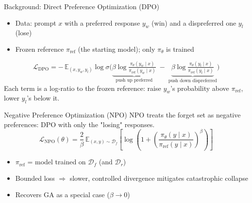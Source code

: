 \documentclass[12pt,aspectratio=169,handout]{beamer}
\begin{document}
\begin{frame}{Background: Direct Preference Optimization (DPO)}

\begin{itemize}
    \item Data: prompt $x$ with a \alert{preferred} response $y_w$ (win) and a
          \alert{dispreferred} one $y_l$ (lose)
    \item Frozen \alert{reference} $\pi_{\text{ref}}$ (the starting model);
          only $\pi_\theta$ is trained
\end{itemize}
\[
    \mathcal{L}_{\text{DPO}}
    = -\,\mathbb{E}_{(x, y_w, y_l)}
    \log \sigma\!\Big(
    \underbrace{\beta \log \tfrac{\pi_\theta(y_w \mid x)}{\pi_{\text{ref}}(y_w \mid x)}}_{\text{push up preferred}}
    \;-\;
    \underbrace{\beta \log \tfrac{\pi_\theta(y_l \mid x)}{\pi_{\text{ref}}(y_l \mid x)}}_{\text{push down dispreferred}}
    \Big)
\]
Each term is a \alert{log-ratio to the frozen reference}: raise $y_w$'s
probability above $\pi_{\text{ref}}$, lower $y_l$'s below it.

\end{frame}


\begin{frame}{Negative Preference Optimization (NPO)}
\alert{NPO} treats the
forget set as \alert{negative preferences}: DPO with only the "losing"
responses.
\[
    \mathcal{L}_{\text{NPO}}(\theta)
    = \frac{2}{\beta}\,
    \mathbb{E}_{(x,y)\sim\mathcal{D}_f}
    \left[ \log\!\left( 1 +
    \left( \frac{\pi_\theta(y \mid x)}{\pi_{\text{ref}}(y \mid x)} \right)^{\beta}
    \right) \right]
\]
\begin{itemize}
    \item $\pi_{\text{ref}}$ = model trained on $\mathcal{D}_f$ (and $\mathcal{D}_r$)
    \item Bounded loss $\Rightarrow$ slower, controlled divergence  \alert{mitigates catastrophic collapse}
    \item Recovers GA as a special case ($\beta \to 0$)
\end{itemize}
 
  
\end{frame}
\end{document}
